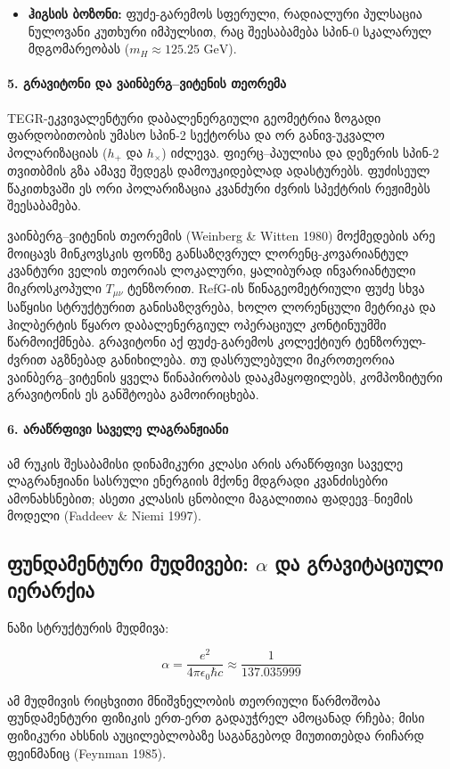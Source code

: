 \documentclass[11pt,a4paper]{article}
\begin{document}
\begin{itemize}
\item \textbf{ჰიგსის ბოზონი:} ფუძე-გარემოს სფერული, რადიალური პულსაცია ნულოვანი კუთხური იმპულსით, რაც შეესაბამება სპინ-0 სკალარულ მდგომარეობას ($m_H \approx 125.25 \text{ GeV}$).

\end{itemize}
\paragraph{5. გრავიტონი და ვაინბერგ–ვიტენის თეორემა}

TEGR-ეკვივალენტური დაბალენერგიული გეომეტრია ზოგადი ფარდობითობის უმასო სპინ-2 სექტორსა და ორ განივ-უკვალო პოლარიზაციას ($h_+$ და $h_\times$) იძლევა. ფიერც–პაულისა და დეზერის სპინ-2 თვითბმის გზა ამავე შედეგს დამოუკიდებლად ადასტურებს. ფუძისეულ წაკითხვაში ეს ორი პოლარიზაცია კვანძური ძვრის სპექტრის რეჟიმებს შეესაბამება.

ვაინბერგ–ვიტენის თეორემის (Weinberg \& Witten 1980) მოქმედების არე მოიცავს მინკოვსკის ფონზე განსაზღვრულ ლორენც-კოვარიანტულ კვანტური ველის თეორიას ლოკალური, ყალიბურად ინვარიანტული მიკროსკოპული $T_{\mu\nu}$ ტენზორით. RefG-ის წინაგეომეტრიული ფუძე სხვა საწყისი სტრუქტურით განისაზღვრება, ხოლო ლორენცული მეტრიკა და ჰილბერტის წყარო დაბალენერგიულ ოპერაციულ კონტინუუმში წარმოიქმნება. გრავიტონი აქ ფუძე-გარემოს კოლექტიურ ტენზორულ-ძვრით აგზნებად განიხილება. თუ დასრულებული მიკროთეორია ვაინბერგ–ვიტენის ყველა წინაპირობას დააკმაყოფილებს, კომპოზიტური გრავიტონის ეს განშტოება გამოირიცხება.

\paragraph{6. არაწრფივი საველე ლაგრანჟიანი}

ამ რუკის შესაბამისი დინამიკური კლასი არის არაწრფივი საველე ლაგრანჟიანი სასრული ენერგიის მქონე მდგრადი კვანძისებრი ამონახსნებით; ასეთი კლასის ცნობილი მაგალითია ფადეევ–ნიემის მოდელი (Faddeev \& Niemi 1997).


\subsection{ფუნდამენტური მუდმივები: \texorpdfstring{$\alpha$}{alpha} და გრავიტაციული იერარქია}

ნაზი სტრუქტურის მუდმივა:

\[
\alpha = \frac{e^2}{4\pi \epsilon_0 \hbar c} \approx \frac{1}{137.035999}
\]

ამ მუდმივის რიცხვითი მნიშვნელობის თეორიული წარმოშობა ფუნდამენტური ფიზიკის ერთ-ერთ გადაუჭრელ ამოცანად რჩება; მისი ფიზიკური ახსნის აუცილებლობაზე საგანგებოდ მიუთითებდა რიჩარდ ფეინმანიც (Feynman 1985).
\end{document}
